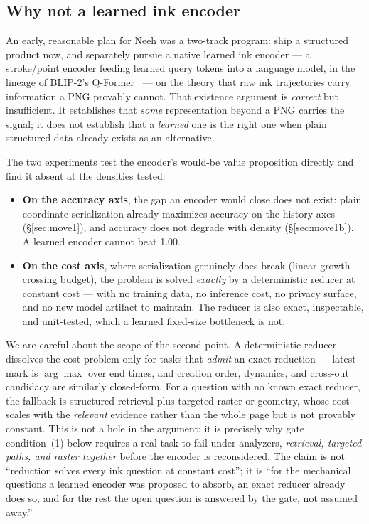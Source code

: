 \documentclass[11pt]{article}
\begin{document}
\subsection{Why not a learned ink encoder}
An early, reasonable plan for Neeh was a two-track program: ship a structured
product now, and separately pursue a native learned ink encoder --- a
stroke/point encoder feeding learned query tokens into a language model, in the
lineage of BLIP-2's Q-Former~\cite{blip2} --- on the theory that raw ink
trajectories carry information a PNG provably cannot. That existence argument is
\emph{correct} but insufficient. It establishes that \emph{some} representation
beyond a PNG carries the signal; it does not establish that a \emph{learned} one
is the right one when plain structured data already exists as an alternative.

The two experiments test the encoder's would-be value proposition directly and
find it absent at the densities tested:
\begin{itemize}[leftmargin=1.4em, itemsep=2pt]
\item \textbf{On the accuracy axis}, the gap an encoder would close does not
  exist: plain coordinate serialization already maximizes accuracy on the
  history axes (\S\ref{sec:move1}), and accuracy does not degrade with density
  (\S\ref{sec:move1b}). A learned encoder cannot beat 1.00.
\item \textbf{On the cost axis}, where serialization genuinely does break (linear
  growth crossing budget), the problem is solved \emph{exactly} by a
  deterministic reducer at constant cost --- with no training data, no inference
  cost, no privacy surface, and no new model artifact to maintain. The reducer is
  also exact, inspectable, and unit-tested, which a learned fixed-size bottleneck
  is not.
\end{itemize}

We are careful about the scope of the second point. A deterministic reducer
dissolves the cost problem only for tasks that \emph{admit} an exact reduction ---
latest-mark is $\arg\max$ over end times, and creation order, dynamics, and
cross-out candidacy are similarly closed-form. For a question with no known exact
reducer, the fallback is structured retrieval plus targeted raster or geometry,
whose cost scales with the \emph{relevant} evidence rather than the whole page but
is not provably constant. This is not a hole in the argument; it is precisely why
gate condition~(1) below requires a real task to fail under analyzers,
\emph{retrieval, targeted paths, and raster together} before the encoder is
reconsidered. The claim is not ``reduction solves every ink question at constant
cost''; it is ``for the mechanical questions a learned encoder was proposed to
absorb, an exact reducer already does so, and for the rest the open question is
answered by the gate, not assumed away.''
\end{document}
